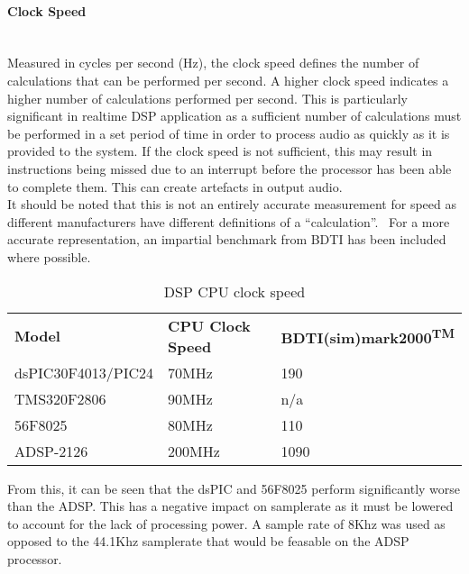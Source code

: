 \documentclass[titlepage]{scrartcl}
\begin{document}
    \paragraph{Clock Speed}~\\
    Measured in cycles per second (Hz), the clock speed defines the number of
    calculations that can be performed per second. A higher clock speed
    indicates a higher number of calculations performed per second. This is
    particularly significant in realtime DSP application as a sufficient number
    of calculations must be performed in a set period of time in order to
    process audio as quickly as it is provided to the system.  If the clock
    speed is not sufficient, this may result in instructions being missed due
    to an interrupt before the processor has been able to complete them. This
    can create artefacts in output audio.~\parencite[p.34]{sd2006mfes}\\

    It should be noted that this is not an entirely accurate measurement for
    speed as different manufacturers have different definitions of a
    ``calculation''.~\parencite[p.3-4]{bdti2000cdp} For a more accurate
    representation, an impartial benchmark from BDTI has been included where
    possible.~\parencite[p.1]{bdti2013pg}
    \begin{table}[H]
    \centering
    \caption{DSP CPU clock speed}
    \label{my-label}
    \begin{tabular}{lll}
        \textbf{Model}              & \textbf{CPU Clock Speed}
                                    &\textbf{BDTI(sim)mark2000\textsuperscript{TM}}\\
        dsPIC30F4013/PIC24 & 70MHz              & 190\\
        TMS320F2806        & 90MHz              & n/a\\
        56F8025            & 80MHz              & 110\\
        ADSP-2126          & 200MHz             & 1090\\
    \end{tabular}
    \end{table}
    From this, it can be seen that the dsPIC and 56F8025 perform significantly
    worse than the ADSP. This has a negative impact on samplerate as it must be
    lowered to account for the lack of processing power. A sample rate of 8Khz
    was used as opposed to the 44.1Khz samplerate that would be feasable on the
    ADSP processor.
\end{document}
